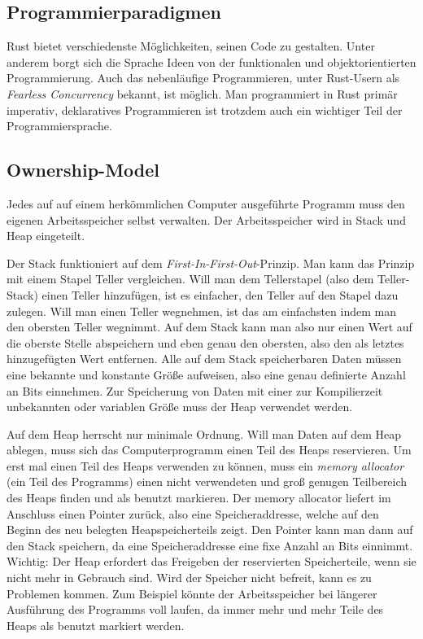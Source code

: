 \subsection{Programmierparadigmen}
Rust bietet verschiedenste Möglichkeiten, seinen Code zu gestalten. Unter
anderem borgt sich die Sprache Ideen von der funktionalen und objektorientierten
Programmierung. Auch das nebenläufige Programmieren, unter Rust-Usern als
\textit{Fearless Concurrency} bekannt, ist möglich. Man programmiert in Rust
primär imperativ, deklaratives Programmieren ist trotzdem auch ein wichtiger
Teil der Programmiersprache.

\subsection{Ownership-Model}
Jedes auf auf einem herkömmlichen Computer ausgeführte Programm muss den eigenen Arbeitsspeicher selbst verwalten.
Der Arbeitsspeicher wird in Stack und Heap eingeteilt.

Der Stack funktioniert auf dem \textit{First-In-First-Out}-Prinzip. Man kann das Prinzip mit einem Stapel Teller vergleichen.
Will man dem Tellerstapel (also dem Teller-Stack) einen Teller hinzufügen, ist es einfacher,
den Teller auf den Stapel dazu zulegen. Will man einen Teller wegnehmen, ist das am einfachsten indem man den obersten Teller wegnimmt.
Auf dem Stack kann man also nur einen Wert auf die oberste Stelle abspeichern und eben genau den obersten, also den als letztes hinzugefügten
Wert entfernen. Alle auf dem Stack speicherbaren Daten müssen eine bekannte und konstante Größe aufweisen, also eine genau definierte Anzahl
an Bits einnehmen. Zur Speicherung von Daten mit einer zur Kompilierzeit unbekannten oder variablen Größe muss der Heap verwendet werden.

Auf dem Heap herrscht nur minimale Ordnung. Will man Daten auf dem Heap ablegen, muss sich das Computerprogramm einen Teil des Heaps
reservieren. Um erst mal einen Teil des Heaps verwenden zu können, muss ein \textit{memory allocator} (ein Teil des Programms) einen nicht
verwendeten und groß genugen Teilbereich des Heaps finden und als benutzt markieren. Der memory allocator liefert im Anschluss einen Pointer zurück,
also eine Speicheraddresse, welche auf den Beginn des neu belegten Heapspeicherteils zeigt. Den Pointer kann man dann auf den Stack speichern, da eine
Speicheraddresse eine fixe Anzahl an Bits einnimmt. Wichtig: Der Heap erfordert das Freigeben der reservierten Speicherteile, wenn sie nicht
mehr in Gebrauch sind. Wird der Speicher nicht befreit, kann es zu Problemen kommen. Zum Beispiel könnte der Arbeitsspeicher bei längerer
Ausführung des Programms voll laufen, da immer mehr und mehr Teile des Heaps als benutzt markiert werden.

